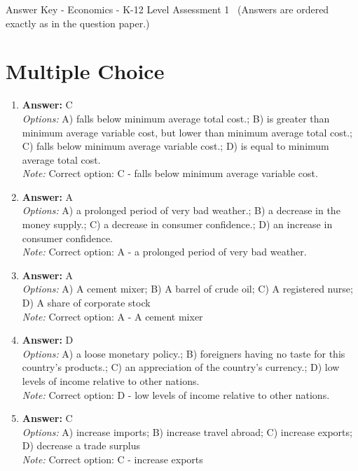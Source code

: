 \documentclass[12pt]{article}
\begin{document}
\begin{center}
Answer Key - Economics - K-12 Level Assessment 1 \
\small (Answers are ordered exactly as in the question paper.)
\end{center}

\section*{Multiple Choice}
\begin{enumerate}[label=\arabic*.]
\item \textbf{Answer:} C
\\ \textit{Options:} A) falls below minimum average total cost.; B) is greater than minimum average variable cost, but lower than minimum average total cost.; C) falls below minimum average variable cost.; D) is equal to minimum average total cost.
\\ \textit{Note:} Correct option: C - falls below minimum average variable cost.
\item \textbf{Answer:} A
\\ \textit{Options:} A) a prolonged period of very bad weather.; B) a decrease in the money supply.; C) a decrease in consumer confidence.; D) an increase in consumer confidence.
\\ \textit{Note:} Correct option: A - a prolonged period of very bad weather.
\item \textbf{Answer:} A
\\ \textit{Options:} A) A cement mixer; B) A barrel of crude oil; C) A registered nurse; D) A share of corporate stock
\\ \textit{Note:} Correct option: A - A cement mixer
\item \textbf{Answer:} D
\\ \textit{Options:} A) a loose monetary policy.; B) foreigners having no taste for this country's products.; C) an appreciation of the country's currency.; D) low levels of income relative to other nations.
\\ \textit{Note:} Correct option: D - low levels of income relative to other nations.
\item \textbf{Answer:} C
\\ \textit{Options:} A) increase imports; B) increase travel abroad; C) increase exports; D) decrease a trade surplus
\\ \textit{Note:} Correct option: C - increase exports
\end{enumerate}
\end{document}
